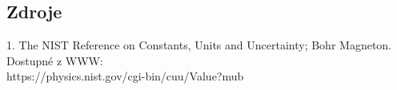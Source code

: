 \documentclass[czech,11pt,a4paper]{article}
\begin{document}
\begin{multicols}{2}
		\section{Zdroje}
		1. The NIST Reference on Constants, Units and Uncertainty; Bohr Magneton.\\ Dostupné z WWW:\\ https://physics.nist.gov/cgi-bin/cuu/Value?mub
		
		
		
	\end{multicols}
\end{document}
